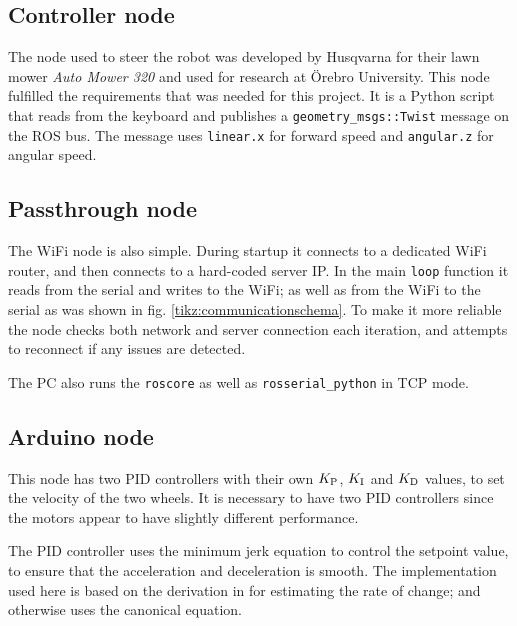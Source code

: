 \documentclass[11pt]{article}
\begin{document}
\newpage


\subsection{Controller node}
The node used to steer the robot was developed by Husqvarna for their lawn mower
\emph{Auto Mower 320} and used for research at Örebro University. This node
fulfilled the requirements that was needed for this project. It is a Python
script that reads from the keyboard and publishes a
\texttt{geometry\_msgs::Twist} message on the ROS bus. The message uses
\texttt{linear.x} for forward speed and \texttt{angular.z} for angular speed.
\label{subsec:cn}


\subsection{Passthrough node}
\label{subsec:ptn}
The WiFi node is also simple. During startup it connects to a dedicated WiFi
router, and then connects to a hard-coded server IP. In the main \texttt{loop}
function it reads from the serial and writes to the WiFi; as well as from the
WiFi to the serial as was shown in fig. \vref{tikz:communicationschema}. To make
it more reliable the node checks both network and server connection each
iteration, and attempts to reconnect if any issues are detected. \par
The PC also runs the \texttt{roscore} as well as \texttt{rosserial\_python} in
TCP mode.
\subsection{Arduino node}
\label{subsec:dd}
This node has two PID controllers with their own ${K_{\textup{P}}}$, ${K_{\textup{I}}}$ and
${K_{\textup{D}}}$ values, to set the velocity of the two wheels. It is necessary to
have two PID controllers since the motors appear to have slightly different
performance. \par

The PID controller uses the minimum jerk equation to control the setpoint value,
to ensure that the acceleration and deceleration is smooth. The implementation
used here is based on the derivation in \cite{mje} for estimating the rate of
change; and otherwise uses the canonical equation. \par
\end{document}
